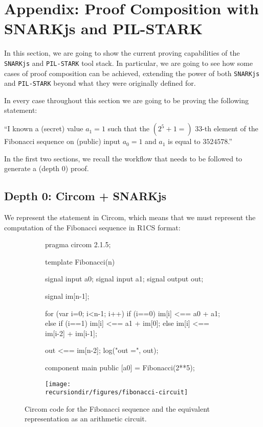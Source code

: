 
\section{Appendix: Proof Composition with SNARKjs and PIL-STARK}

In this section, we are going to show the current proving capabilities of the \texttt{SNARKjs} and \texttt{PIL-STARK} tool stack. In particular, we are going to see how some cases of proof composition can be achieved, extending the power of both \texttt{SNARKjs} and \texttt{PIL-STARK} beyond what they were originally defined for.

In every case throughout this section we are going to be proving the following statement:
\begin{center}
    ``I known a (secret) value $a_1 = 1$ such that the $(2^5+1 =)$ $33$-th element of the Fibonacci sequence on (public) input $a_0 = 1$ and $a_1$ is equal to $3524578$.''
\end{center} 

In the first two sections, we recall the workflow that needs to be followed to generate a (depth $0$) proof.


\subsection{Depth 0: Circom + SNARKjs}

We represent the statement in Circom, which means that we must represent the computation of the Fibonacci sequence in R1CS format:

\begin{figure}[H]
\centering
\begin{subfigure}[T]{0.5\textwidth}
\begin{circom}
pragma circom 2.1.5;

template Fibonacci(n) {
    signal input a0;
    signal input a1;
    signal output out;

    signal im[n-1];

    for (var i=0; i<n-1; i++) {
        if (i==0) {
            im[i] <== a0 + a1;
        } else if (i==1) {
            im[i] <== a1 + im[0];
        } else {
            im[i] <== im[i-2] + im[i-1];
        }
    }

    out <== im[n-2];
    log("out =", out);
}

component main {public [a0]} = Fibonacci(2**5);
\end{circom}
\end{subfigure}
\begin{subfigure}[T]{0.4\textwidth}
    \centering
    \texttt{[image: \\recursiondir/figures/fibonacci-circuit]}
\end{subfigure}
\caption{Circom code for the Fibonacci sequence and the equivalent representation as an arithmetic circuit.}
\end{figure}

